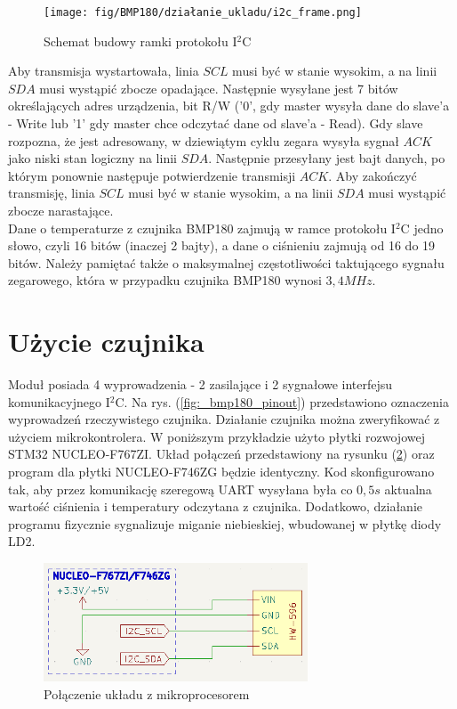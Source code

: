 \documentclass[11pt, a4paper]{article}
\begin{document}
\vspace{0.25cm}
\begin{figure}[h]
    \centering
    \texttt{[image: fig/BMP180/działanie\_ukladu/i2c\_frame.png]}
    \caption{Schemat budowy ramki protokołu I$^2$C \cite{Bosch:BMP180}}
    \label{fig:_i2c_frame}
\end{figure}
\vspace{0.25cm}
Aby transmisja wystartowała, linia $SCL$ musi być w stanie wysokim, a na linii $SDA$ musi wystąpić zbocze opadające. Następnie wysyłane jest 7 bitów określających adres urządzenia, bit R/W ('0', gdy master wysyła dane do slave'a - Write lub '1' gdy master chce odczytać dane od slave'a - Read). Gdy slave rozpozna, że jest adresowany, w dziewiątym cyklu zegara wysyła sygnał $ACK$ jako niski stan logiczny na linii $SDA$. Następnie przesyłany jest bajt danych, po którym ponownie następuje potwierdzenie transmisji $ACK$. Aby zakończyć transmisję, linia $SCL$ musi być w stanie wysokim, a na linii $SDA$ musi wystąpić zbocze narastające.
\\
Dane o temperaturze z czujnika BMP180 zajmują w ramce protokołu I$^2$C jedno słowo, czyli 16 bitów (inaczej 2 bajty), a dane o ciśnieniu zajmują od 16 do 19 bitów. Należy pamiętać także o maksymalnej częstotliwości taktującego sygnału zegarowego, która w przypadku czujnika BMP180 wynosi $3,4MHz$.



\section{Użycie czujnika}
Moduł posiada 4 wyprowadzenia - 2 zasilające i 2 sygnałowe interfejsu komunikacyjnego I$^2$C. Na rys. (\ref{fig:_bmp180_pinout}) przedstawiono oznaczenia wyprowadzeń rzeczywistego czujnika. Działanie czujnika można zweryfikować z użyciem mikrokontrolera. W poniższym przykładzie użyto płytki rozwojowej STM32 NUCLEO-F767ZI. Układ połączeń przedstawiony na rysunku (\ref{fig:_polaczenie_ukladu}) oraz program dla płytki NUCLEO-F746ZG będzie identyczny. Kod skonfigurowano tak, aby przez komunikację szeregową UART wysyłana była co $0,5s$ aktualna wartość ciśnienia i temperatury odczytana z czujnika. Dodatkowo, działanie programu fizycznie sygnalizuje miganie niebieskiej, wbudowanej w płytkę diody LD2.

\vspace{0.25cm}
\begin{figure}[h]
    \centering
    \includegraphics[width=0.7\textwidth]{fig/BMP180/polaczenie_modulu/nucleo_con.png}
    \caption{Połączenie układu z mikroprocesorem}
    \label{fig:_polaczenie_ukladu}
\end{figure}
\vspace{0.25cm}
\end{document}
